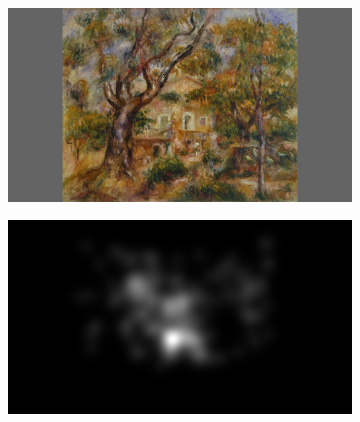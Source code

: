 \begin{figure}[ht]
    \centering
    \begin{subfigure}{.49\textwidth}
        \includegraphics[width=\linewidth]{datas/samresnet/stimulus_La_Ferme_des_Collettes_Renoir_1908.png}
        \caption{}
    \end{subfigure}
    \begin{subfigure}{.49\textwidth}
        \includegraphics[width=\linewidth]{datas/samresnet/human_La_Ferme_des_Collettes_Renoir_1908.png}
        \caption{}
    \end{subfigure}


\end{figure}
